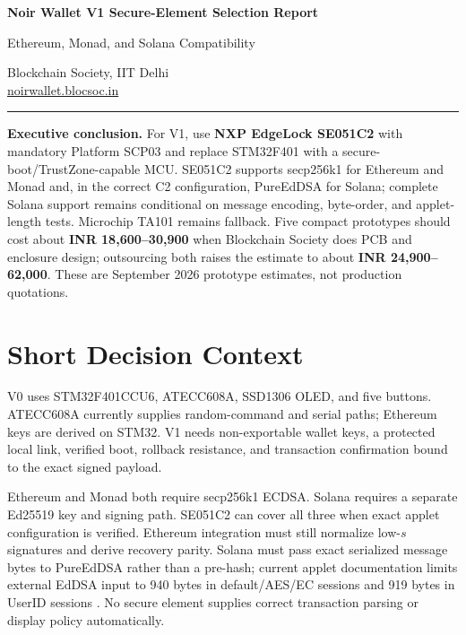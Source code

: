 \documentclass[10pt]{article}
\begin{document}
\begin{center}
  {\LARGE\bfseries Noir Wallet V1 Secure-Element Selection Report\par}
  \vspace{0.35em}
  {\large Ethereum, Monad, and Solana Compatibility\par}
  \vspace{0.55em}
  {Blockchain Society, IIT Delhi}\\
  \href{https://noirwallet.blocsoc.in}{noirwallet.blocsoc.in}
\end{center}
\vspace{0.5em}
\noindent\rule{\textwidth}{0.6pt}

\textbf{Executive conclusion.}
For V1, use \textbf{NXP EdgeLock SE051C2} with mandatory Platform SCP03 and
replace STM32F401 with a secure-boot/TrustZone-capable MCU. SE051C2 supports
secp256k1 for Ethereum and Monad and, in the correct C2 configuration,
PureEdDSA for Solana; complete Solana support remains conditional on message
encoding, byte-order, and applet-length tests. Microchip TA101 remains fallback. Five compact prototypes
should cost about \textbf{INR 18,600--30,900} when Blockchain Society
does PCB and enclosure design; outsourcing both raises the estimate to about
\textbf{INR 24,900--62,000}. These are September 2026 prototype
estimates, not production quotations.

\section{Short Decision Context}
V0 uses STM32F401CCU6, ATECC608A, SSD1306 OLED, and five buttons. ATECC608A
currently supplies random-command and serial paths; Ethereum keys are derived
on STM32. V1 needs non-exportable wallet keys, a protected local link, verified
boot, rollback resistance, and transaction confirmation bound to the exact
signed payload.

Ethereum and Monad both require secp256k1 ECDSA. Solana requires a separate
Ed25519 key and signing path. SE051C2 can cover all three when exact applet
configuration is verified. Ethereum integration must still normalize low-$s$
signatures and derive recovery parity. Solana must pass exact serialized
message bytes to PureEdDSA rather than a pre-hash; current applet documentation
limits external EdDSA input to 940 bytes in default/AES/EC sessions and 919
bytes in UserID sessions \cite{nxp-apdu}. No secure element supplies correct
transaction parsing or display policy automatically.
\end{document}
